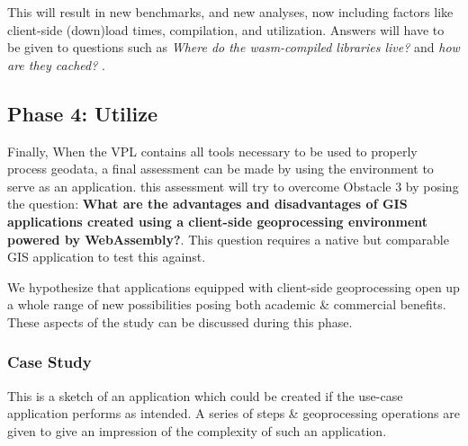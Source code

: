 This will result in new benchmarks, and new analyses, now including factors like client-side (down)load times, compilation, and utilization. Answers will have to be given to questions such as \textit{Where do the wasm-compiled libraries live?} and \textit{ how are they cached? }.





\subsection{Phase 4: Utilize}

Finally, When the VPL contains all tools necessary to be used to properly process geodata, a final assessment can be made by using the environment to serve as an application. this assessment will try to overcome Obstacle 3 by posing the question: \textbf{What are the advantages and disadvantages of GIS applications created using a client-side geoprocessing environment powered by WebAssembly?}. This question requires a native but comparable GIS application to test this against.  

We hypothesize that applications equipped with client-side geoprocessing open up a whole range of new possibilities posing both academic \& commercial benefits. 
These aspects of the study can be discussed during this phase. 




\subsubsection*{Case Study}

This is a sketch of an application which could be created if the use-case application performs as intended. A series of steps \& geoprocessing operations are given to give an impression of the complexity of such an application.

